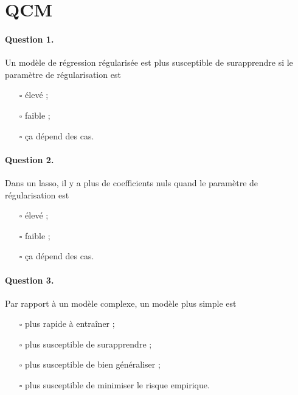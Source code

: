 \section{QCM}
\paragraph{Question 1.} Un modèle de régression régularisée est plus
  susceptible de surapprendre si le paramètre de régularisation est
\begin{itemize}
\item[$\square$] élevé ;
\item[$\square$] faible ;
\item[$\square$] ça dépend des cas.
\end{itemize}

\paragraph{Question 2.}     Dans un lasso, il y a plus de coefficients nuls quand le 
    paramètre de régularisation est 
\begin{itemize}
\item[$\square$] élevé ;
\item[$\square$] faible ;
\item[$\square$] ça dépend des cas.
\end{itemize}

\paragraph{Question 3.} Par rapport à un modèle complexe, un modèle plus simple est
\begin{itemize}
\item[$\square$] plus rapide à entraîner ;
\item[$\square$] plus susceptible de surapprendre ;
\item[$\square$] plus susceptible de bien généraliser ;
\item[$\square$] plus susceptible de minimiser le risque empirique.
\end{itemize}



